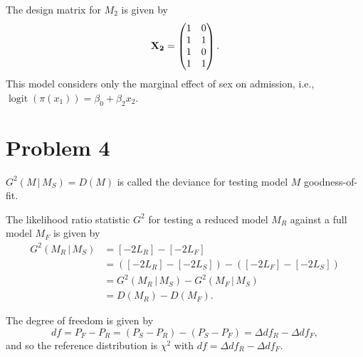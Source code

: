 \documentclass[
  11pt,
]{article}
\begin{document}
The design matrix for \(M_2\) is given by \[
\mathbf{X_2} = 
\begin{pmatrix}
  1 & 0\\
  1 & 1\\
  1 & 0\\
  1 & 1
\end{pmatrix}.
\] This model considers only the marginal effect of sex on admission,
i.e., \(\operatorname{logit}(\pi(x_1)) = \beta_0 + \beta_2 x_2\).

\hypertarget{problem-4}{%
\section{Problem 4}\label{problem-4}}


\(G^2(M\,|\,M_S) = D(M)\) is called the deviance for testing model \(M\)
goodness-of-fit.

The likelihood ratio statistic \(G^2\) for testing a reduced model
\(M_R\) against a full model \(M_F\) is given by \begin{align*}
  G^2(M_R\,|\,M_S)
    &= [-2 L_R]-[-2 L_F]\\
    &= \left([-2 L_R]-[-2 L_S]\right)-\left([-2 L_F]-[-2 L_S] \right)\\
    &= G^2(M_R\,|\,M_S)-G^2(M_F\,|\,M_S)\\
    &= D(M_R) - D(M_F).
\end{align*}

The degree of freedom is given by \[
  df = P_F - P_R = (P_S - P_R) - (P_S - P_F) = \Delta df_R - \Delta df_F,
\] and so the reference distribution is \(\chi^2\) with
\(df = \Delta df_R - \Delta df_F\).
\end{document}
